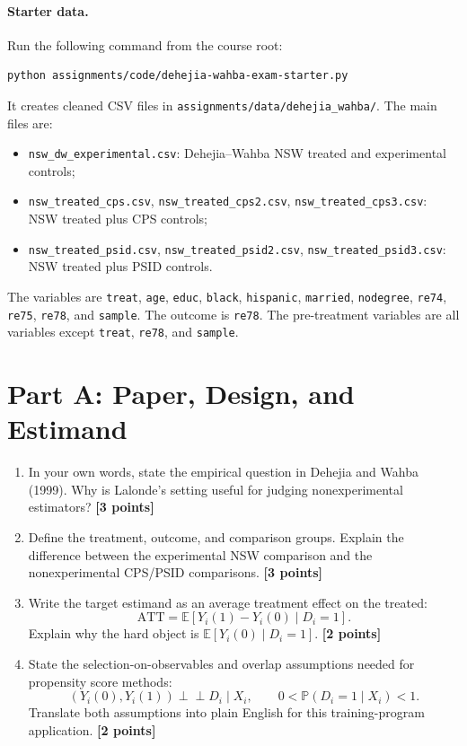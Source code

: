 \documentclass[11pt]{article}
\newcommand{\E}{\mathbb{E}}
\newcommand{\Prob}{\mathbb{P}}
\newcommand{\ATT}{\mathrm{ATT}}
\newcommand{\indep}{\perp\!\!\!\perp}
\newcommand{\points}[1]{\hfill \textbf{[#1 points]}}
\begin{document}
\paragraph{Starter data.} Run the following command from the course root:
\begin{lstlisting}
python assignments/code/dehejia-wahba-exam-starter.py
\end{lstlisting}
It creates cleaned CSV files in \texttt{assignments/data/dehejia\_wahba/}. The main files are:
\begin{itemize}
  \item \texttt{nsw\_dw\_experimental.csv}: Dehejia--Wahba NSW treated and experimental controls;
  \item \texttt{nsw\_treated\_cps.csv}, \texttt{nsw\_treated\_cps2.csv}, \texttt{nsw\_treated\_cps3.csv}: NSW treated plus CPS controls;
  \item \texttt{nsw\_treated\_psid.csv}, \texttt{nsw\_treated\_psid2.csv}, \texttt{nsw\_treated\_psid3.csv}: NSW treated plus PSID controls.
\end{itemize}
The variables are \texttt{treat}, \texttt{age}, \texttt{educ}, \texttt{black}, \texttt{hispanic}, \texttt{married}, \texttt{nodegree}, \texttt{re74}, \texttt{re75}, \texttt{re78}, and \texttt{sample}. The outcome is \texttt{re78}. The pre-treatment variables are all variables except \texttt{treat}, \texttt{re78}, and \texttt{sample}.

\section*{Part A: Paper, Design, and Estimand}

\begin{enumerate}[label=A\arabic*.]
  \item In your own words, state the empirical question in Dehejia and Wahba (1999). Why is Lalonde's setting useful for judging nonexperimental estimators? \points{3}

  \item Define the treatment, outcome, and comparison groups. Explain the difference between the experimental NSW comparison and the nonexperimental CPS/PSID comparisons. \points{3}

  \item Write the target estimand as an average treatment effect on the treated:
  \[
    \ATT = \E[Y_i(1)-Y_i(0)\mid D_i=1].
  \]
  Explain why the hard object is \(\E[Y_i(0)\mid D_i=1]\). \points{2}

  \item State the selection-on-observables and overlap assumptions needed for propensity score methods:
  \[
    (Y_i(0),Y_i(1)) \indep D_i \mid X_i,
    \qquad
    0 < \Prob(D_i=1\mid X_i) < 1.
  \]
  Translate both assumptions into plain English for this training-program application. \points{2}
\end{enumerate}
\end{document}
